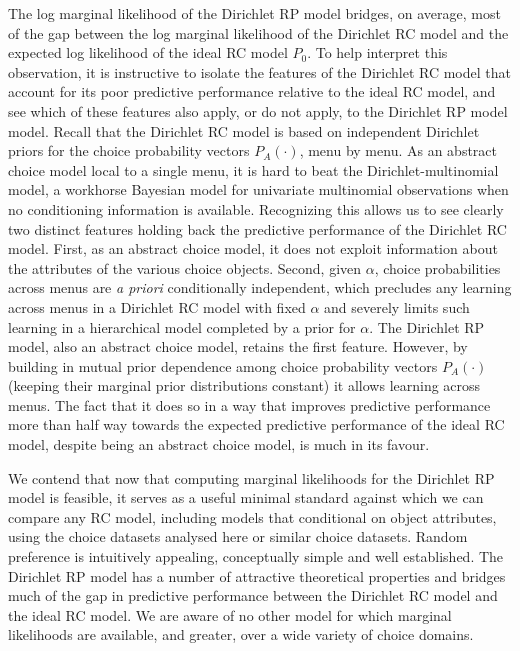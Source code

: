 \documentclass[11pt,letter]{article}
\newcommand{\Dpi}{Dirichlet RP model}
\newcommand{\DP}{Dirichlet RC model}
\begin{document}
The log marginal likelihood of the \Dpi{} bridges, on average, most of the gap between the log marginal likelihood of the \DP{} and the expected log likelihood of the ideal RC model $P_0$.
To help interpret this observation, it is instructive to isolate the features of the \DP{} that account for its poor predictive performance relative to the ideal RC model, and see which of these features also apply, or do not apply, to the \Dpi{} model.
Recall that the \DP{} is based on independent Dirichlet priors for the choice probability vectors $P_A(\cdot)$, menu by menu.
As an abstract choice model local to a single menu, it is hard to beat the Dirichlet-multinomial model, a workhorse Bayesian model for univariate multinomial observations when no conditioning information is available.
Recognizing this allows us to see clearly two distinct features holding back the predictive performance of the \DP{}.
First, as an abstract choice model, it does not exploit information about the attributes of the various choice objects.
Second, given $\alpha$, choice probabilities across menus are {\em a priori} conditionally independent, which precludes any learning across menus in a \DP{} with fixed $\alpha$ and severely limits such learning in a hierarchical model completed by a prior for $\alpha$.
The \Dpi{}, also an abstract choice model, retains the first feature.
However, by building in mutual prior dependence among choice probability vectors $P_A(\cdot)$ (keeping their marginal prior distributions constant) it allows learning across menus.
The fact that it does so in a way that improves predictive performance more than half way towards the expected predictive performance of the ideal RC model, despite being an abstract choice model, is much in its favour.

We contend that now that computing marginal likelihoods for the \Dpi{} is feasible, it serves as a useful minimal standard against which we can compare any RC model, including models that conditional on object attributes, using the choice datasets analysed here or similar choice datasets.
Random preference is intuitively appealing, conceptually simple and well established.
The \Dpi{} has a number of attractive theoretical properties and bridges much of the gap in predictive performance between the \DP{} and the ideal RC model.
We are aware of no other model for which marginal likelihoods are available, and greater, over a wide variety of choice domains.
\end{document}
